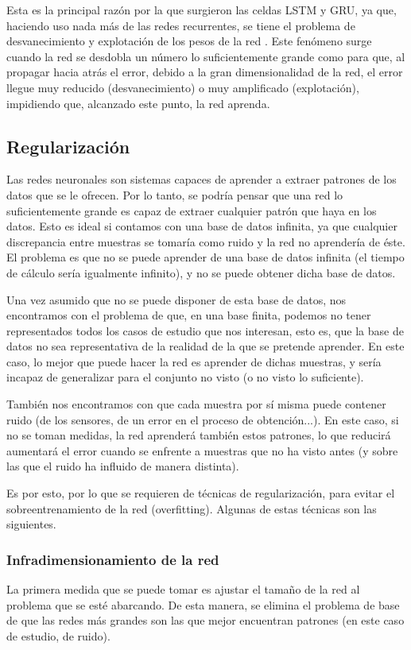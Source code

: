 Esta es la principal razón por la que surgieron las celdas LSTM y GRU, ya que, haciendo uso nada más de las redes recurrentes, se tiene el problema de desvanecimiento y explotación de los pesos de la red \cite{bengio1994learning}. Este fenómeno surge cuando la red se desdobla un número lo suficientemente grande como para que, al propagar hacia atrás el error, debido a la gran dimensionalidad de la red, el error llegue muy reducido (desvanecimiento) o muy amplificado (explotación), impidiendo que, alcanzado este punto, la red aprenda.

\subsection{Regularización}
Las redes neuronales son sistemas capaces de aprender a extraer patrones de los datos que se le ofrecen. Por lo tanto, se podría pensar que una red lo suficientemente grande es capaz de extraer cualquier patrón que haya en los datos. Esto es ideal si contamos con una base de datos infinita, ya que cualquier discrepancia entre muestras se tomaría como ruido y la red no aprendería de éste. El problema es que no se puede aprender de una base de datos infinita (el tiempo de cálculo sería igualmente infinito), y no se puede obtener dicha base de datos.

Una vez asumido que no se puede disponer de esta base de datos, nos encontramos con el problema de que, en una base finita, podemos no tener representados todos los casos de estudio que nos interesan, esto es, que la base de datos no sea representativa de la realidad de la que se pretende aprender. En este caso, lo mejor que puede hacer la red es aprender de dichas muestras, y sería incapaz de generalizar para el conjunto no visto (o no visto lo suficiente).

También nos encontramos con que cada muestra por sí misma puede contener ruido (de los sensores, de un error en el proceso de obtención...). En este caso, si no se toman medidas, la red aprenderá también estos patrones, lo que reducirá aumentará el error cuando se enfrente a muestras que no ha visto antes (y sobre las que el ruido ha influido de manera distinta).

Es por esto, por lo que se requieren de técnicas de regularización, para evitar el sobreentrenamiento de la red (overfitting). Algunas de estas técnicas son las siguientes.

\subsubsection{Infradimensionamiento de la red}
La primera medida que se puede tomar es ajustar el tamaño de la red al problema que se esté abarcando. De esta manera, se elimina el problema de base de que las redes más grandes son las que mejor encuentran patrones (en este caso de estudio, de ruido).
